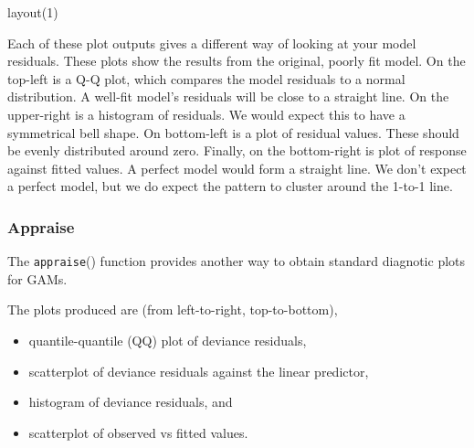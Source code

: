 \documentclass[
]{book}
\newenvironment{Shaded}{\begin{snugshade}}{\end{snugshade}}
\newcommand{\CommentTok}[1]{\textcolor[rgb]{0.56,0.35,0.01}{\textit{#1}}}
\newcommand{\DecValTok}[1]{\textcolor[rgb]{0.00,0.00,0.81}{#1}}
\newcommand{\FunctionTok}[1]{\textcolor[rgb]{0.00,0.00,0.00}{#1}}
\newcommand{\NormalTok}[1]{#1}
\newcommand{\SpecialCharTok}[1]{\textcolor[rgb]{0.00,0.00,0.00}{#1}}
\providecommand{\tightlist}{%
  \setlength{\itemsep}{0pt}\setlength{\parskip}{0pt}}
\begin{document}
\begin{Shaded}
\begin{Highlighting}[]
\FunctionTok{layout}\NormalTok{(}\DecValTok{1}\NormalTok{)}
\end{Highlighting}
\end{Shaded}

Each of these plot outputs gives a different way of looking at your model residuals. These plots show the results from the original, poorly fit model. On the top-left is a Q-Q plot, which compares the model residuals to a normal distribution. A well-fit model's residuals will be close to a straight line. On the upper-right is a histogram of residuals. We would expect this to have a symmetrical bell shape. On bottom-left is a plot of residual values. These should be evenly distributed around zero. Finally, on the bottom-right is plot of response against fitted values. A perfect model would form a straight line. We don't expect a perfect model, but we do expect the pattern to cluster around the 1-to-1 line.

\hypertarget{appraise}{%
\subsubsection{Appraise}\label{appraise}}

The \texttt{appraise}() function provides another way to obtain standard diagnotic plots for GAMs.

The plots produced are (from left-to-right, top-to-bottom),

\begin{itemize}
\tightlist
\item
  quantile-quantile (QQ) plot of deviance residuals,
\item
  scatterplot of deviance residuals against the linear predictor,
\item
  histogram of deviance residuals, and
\item
  scatterplot of observed vs fitted values.
\end{itemize}

\begin{Shaded}
\end{Shaded}
\end{document}
